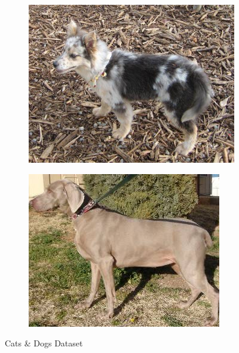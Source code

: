 \begin{figure}
\begin{subfigure}[b]{.2\linewidth}
\end{subfigure}
\begin{subfigure}[b]{.2\linewidth}
\includegraphics[width=\linewidth]{Figs/dog4133.jpg}
\end{subfigure}
\begin{subfigure}[b]{.2\linewidth}
\includegraphics[width=\linewidth]{Figs/dog1178.jpg}
\end{subfigure}
\caption{Cats \& Dogs Dataset}
\label{catdog}
\end{figure}


